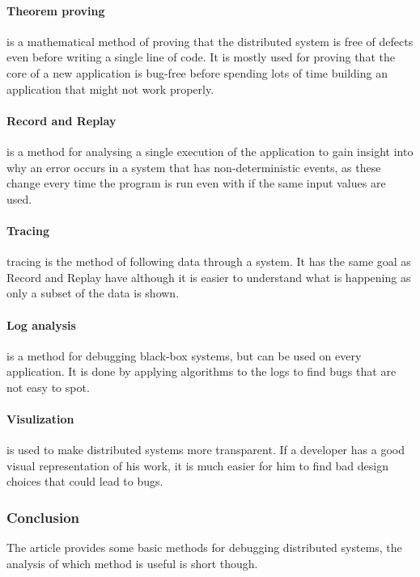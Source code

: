 \paragraph{Theorem proving} is a mathematical method of proving that the distributed system is free of defects even before writing a single line of code. It is mostly used for proving that the core of a new application is bug-free before spending lots of time building an application that might not work properly.

\paragraph{Record and Replay} is a method for analysing a single execution of the application to gain insight into why an error occurs in a system that has non-deterministic events, as these change every time the program is run even with if the same input values are used.

\paragraph{Tracing} tracing is the method of following data through a system. It has the same goal as Record and Replay have although it is easier to understand what is happening as only a subset of the data is shown.

\paragraph{Log analysis} is a method for debugging black-box systems, but can be used on every application. It is done by applying algorithms to the logs to find bugs that are not easy to spot.

\paragraph{Visulization} is used to make distributed systems more transparent. If a developer has a good visual representation of his work, it is much easier for him to find bad design choices that could lead to bugs.

\subsubsection{Conclusion}
The article provides some basic methods for debugging distributed systems, the analysis of which method is useful is short though.
